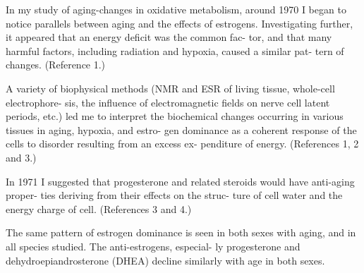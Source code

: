 \documentclass[10pt]{memoir}
\begin{document}
\begin{multicols}{2}

	\noindent In my study of aging-changes in oxidative\linebreak
	metabolism, around 1970 I began to notice\linebreak
	parallels between aging and the effects of\linebreak
	estrogens. Investigating further, it appeared\linebreak
	that an energy deficit was the common fac-\linebreak
	tor, and that many harmful factors, including\linebreak
	radiation and hypoxia, caused a similar pat-\linebreak
	tern of changes. (Reference 1.)

	\bigskip

	\noindent A variety of biophysical methods (NMR and\linebreak
	ESR of living tissue, whole-cell electrophore-\linebreak
	sis, the influence of electromagnetic fields\linebreak
	on nerve cell latent periods, etc.) led me to\linebreak
	interpret the biochemical changes occurring\linebreak
	in various tissues in aging, hypoxia, and estro-\linebreak
	gen dominance as a coherent response of the\linebreak
	cells to disorder resulting from an excess ex-\linebreak
	penditure of energy. (References 1, 2 and 3.)

	\bigskip

	\noindent In 1971 I suggested that progesterone and\linebreak
	related steroids would have anti-aging proper-\linebreak
	ties deriving from their effects on the struc-\linebreak
	ture of cell water and the energy charge of\linebreak
	cell. (References 3 and 4.)

	\bigskip

	\noindent The same pattern of estrogen dominance is\linebreak
	seen in both sexes with aging, and in all\linebreak
	species studied. The anti-estrogens, especial-\linebreak
	ly progesterone and dehydroepiandrosterone\linebreak
	(DHEA) decline similarly with age in both\linebreak
	sexes.


\end{multicols}
\end{document}
